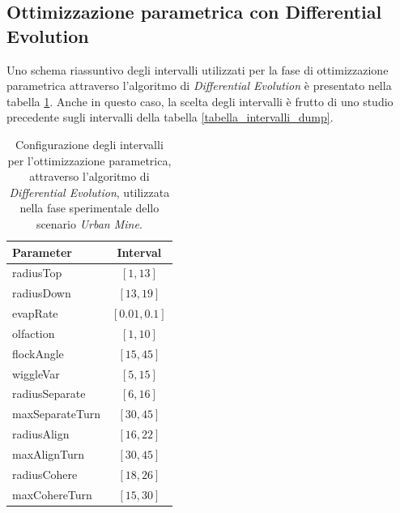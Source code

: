 \subsection{Ottimizzazione parametrica con Differential Evolution}

Uno schema riassuntivo degli intervalli utilizzati per la fase di ottimizzazione parametrica attraverso l'algoritmo di \textit{Differential Evolution} è presentato nella tabella \ref{tabella_intervalli_urbanMine}.
Anche in questo caso, la scelta degli intervalli è frutto di uno studio precedente sugli intervalli della tabella \ref{tabella_intervalli_dump}.

\begin{table}[H]
    \centering
    \captionsetup{justification=centering, margin=2cm, font=footnotesize}
    \begin{tabular}{|l|c|}
    \hline
    \textbf{Parameter}              & \textbf{Interval}                 \\ \hline
    radiusTop                       & $[1,13]$                          \\ \hline
    radiusDown                      & $[13,19]$                         \\ \hline
    evapRate                        & $[0.01,0.1]$                      \\ \hline
    olfaction                       & $[1,10]$                          \\ \hline
    flockAngle                      & $[15,45]$                         \\ \hline
    wiggleVar                       & $[5,15]$                          \\ \hline
    radiusSeparate                  & $[6,16]$                          \\ \hline
    maxSeparateTurn                 & $[30,45]$                         \\ \hline
    radiusAlign                     & $[16,22]$                         \\ \hline
    maxAlignTurn                    & $[30,45]$                         \\ \hline
    radiusCohere                    & $[18,26]$                         \\ \hline
    maxCohereTurn                   & $[15,30]$                         \\ \hline
    \end{tabular}%
    
    \caption{Configurazione degli intervalli per l'ottimizzazione parametrica, attraverso l'algoritmo di \textit{Differential Evolution}, utilizzata nella fase sperimentale dello scenario \textit{Urban Mine}.}
    \label{tabella_intervalli_urbanMine}
\end{table}

